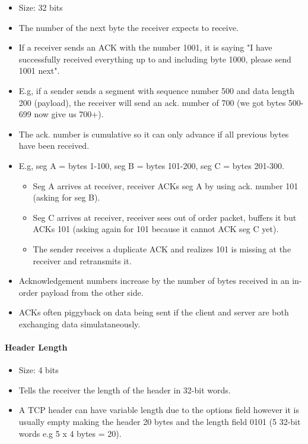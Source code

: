 \documentclass{article}
\begin{document}
\begin{itemize}
    \item Size: 32 bits
    \item The number of the next byte the receiver expects to receive.
    \item If a receiver sends an ACK with the number 1001, it is saying "I have successfully received everything up to and including byte 1000, please send 1001 next".
    \item E.g, if a sender sends a segment with sequence number 500 and data length 200 (payload), the receiver will send an ack. number of 700 (we got bytes 500-699 now give us 700+).
    \item The ack. number is cumulative so it can only advance if all previous bytes have been received.
    \item E.g, seg A = bytes 1-100, seg B = bytes 101-200, seg C = bytes 201-300.
    \begin{itemize}
        \item Seg A arrives at receiver, receiver ACKs seg A by using ack. number 101 (asking for seg B).
        \item Seg C arrives at receiver, receiver sees out of order packet, buffers it but ACKs 101 (asking again for 101 because it cannot ACK seg C yet).
        \item The sender receives a duplicate ACK and realizes 101 is missing at the receiver and retransmits it.
    \end{itemize}
    \item Acknowledgement numbers increase by the number of bytes received in an in-order payload from the other side.
    \item ACKs often piggyback on data being sent if the client and server are both exchanging data simulataneously.
\end{itemize}

\paragraph{Header Length}

\begin{itemize}
    \item Size: 4 bits
    \item Tells the receiver the length of the header in 32-bit words.
    \item A TCP header can have variable length due to the options field however it is usually empty making the header 20 bytes and the length field 0101 (5 32-bit words e.g 5 x 4 bytes = 20).
\end{itemize}
\end{document}
